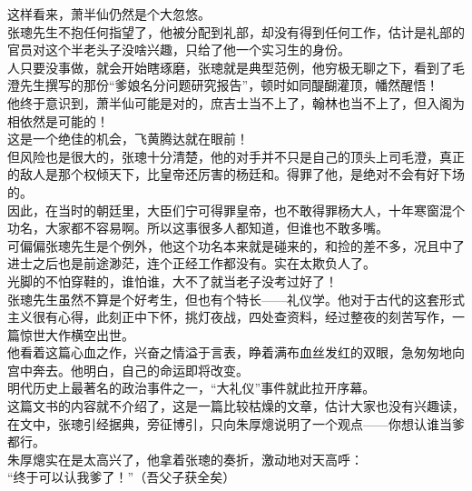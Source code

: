 \begin{multicols}{\theparacolNo}
这样看来，萧半仙仍然是个大忽悠。\\

张璁先生不抱任何指望了，他被分配到礼部，却没有得到任何工作，估计是礼部的官员对这个半老头子没啥兴趣，只给了他一个实习生的身份。\\

人只要没事做，就会开始瞎琢磨，张璁就是典型范例，他穷极无聊之下，看到了毛澄先生撰写的那份“爹娘名分问题研究报告”，顿时如同醍醐灌顶，幡然醒悟！\\

他终于意识到，萧半仙可能是对的，庶吉士当不上了，翰林也当不上了，但入阁为相依然是可能的！\\

这是一个绝佳的机会，飞黄腾达就在眼前！\\

但风险也是很大的，张璁十分清楚，他的对手并不只是自己的顶头上司毛澄，真正的敌人是那个权倾天下，比皇帝还厉害的杨廷和。得罪了他，是绝对不会有好下场的。\\

因此，在当时的朝廷里，大臣们宁可得罪皇帝，也不敢得罪杨大人，十年寒窗混个功名，大家都不容易啊。所以这事很多人都知道，但谁也不敢多嘴。\\

可偏偏张璁先生是个例外，他这个功名本来就是碰来的，和捡的差不多，况且中了进士之后也是前途渺茫，连个正经工作都没有。实在太欺负人了。\\

光脚的不怕穿鞋的，谁怕谁，大不了就当老子没考过好了！\\

张璁先生虽然不算是个好考生，但也有个特长——礼仪学。他对于古代的这套形式主义很有心得，此刻正中下怀，挑灯夜战，四处查资料，经过整夜的刻苦写作，一篇惊世大作横空出世。\\

他看着这篇心血之作，兴奋之情溢于言表，睁着满布血丝发红的双眼，急匆匆地向宫中奔去。他明白，自己的命运即将改变。\\

明代历史上最著名的政治事件之一，“大礼仪”事件就此拉开序幕。\\

这篇文书的内容就不介绍了，这是一篇比较枯燥的文章，估计大家也没有兴趣读，在文中，张璁引经据典，旁征博引，只向朱厚熜说明了一个观点——你想认谁当爹都行。\\

朱厚熜实在是太高兴了，他拿着张璁的奏折，激动地对天高呼：\\

“终于可以认我爹了！”（吾父子获全矣）\\


\end{multicols}

